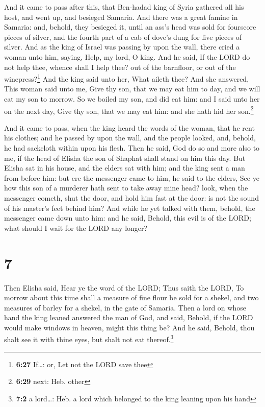 And it came to pass after this, that Ben-hadad king of
Syria gathered all his host, and went up, and besieged Samaria.
 And there was a great famine in Samaria: and, behold,
they besieged it, until an ass's head was sold for fourscore pieces of
silver, and the fourth part of a cab of dove's dung for five pieces of
silver.  And as the king of Israel was passing by upon
the wall, there cried a woman unto him, saying, Help, my lord, O king.
 And he said, If the LORD do not help thee, whence shall
I help thee? out of the barnfloor, or out of the winepress?\footnote{\textbf{6:27}
  If\ldots: or, Let not the LORD save thee}  And the king
said unto her, What aileth thee? And she answered, This woman said unto
me, Give thy son, that we may eat him to day, and we will eat my son to
morrow.  So we boiled my son, and did eat him: and I said
unto her on the next day, Give thy son, that we may eat him: and she
hath hid her son.\footnote{\textbf{6:29} next: Heb. other}

 And it came to pass, when the king heard the words of
the woman, that he rent his clothes; and he passed by upon the wall, and
the people looked, and, behold, he had sackcloth within upon his flesh.
 Then he said, God do so and more also to me, if the head
of Elisha the son of Shaphat shall stand on him this day.
 But Elisha sat in his house, and the elders sat with
him; and the king sent a man from before him: but ere the messenger came
to him, he said to the elders, See ye how this son of a murderer hath
sent to take away mine head? look, when the messenger cometh, shut the
door, and hold him fast at the door: is not the sound of his master's
feet behind him?  And while he yet talked with them,
behold, the messenger came down unto him: and he said, Behold, this evil
is of the LORD; what should I wait for the LORD any longer?

\hypertarget{section-6}{%
\section{7}\label{section-6}}

 Then Elisha said, Hear ye the word of the LORD; Thus
saith the LORD, To morrow about this time shall a measure of fine flour
be sold for a shekel, and two measures of barley for a shekel, in the
gate of Samaria.  Then a lord on whose hand the king
leaned answered the man of God, and said, Behold, if the LORD would make
windows in heaven, might this thing be? And he said, Behold, thou shalt
see it with thine eyes, but shalt not eat thereof.\footnote{\textbf{7:2}
  a lord\ldots: Heb. a lord which belonged to the king leaning upon his
  hand}

